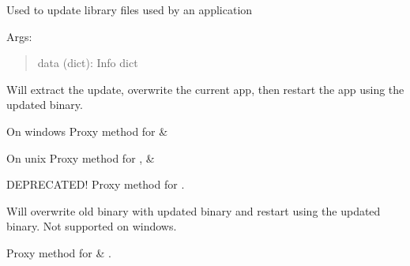 \documentclass[letterpaper,10pt,english]{sphinxmanual}
\begin{document}

\begin{fulllineitems}
\label{api:pyi_updater.client.updates.AppUpdate}
Used to update library files used by an application

Args:
\begin{quote}

data (dict): Info dict
\end{quote}

\begin{fulllineitems}
\label{api:pyi_updater.client.updates.AppUpdate.extract_restart}
Will extract the update, overwrite the current app,
then restart the app using the updated binary.

On windows Proxy method for  \&

On unix Proxy method for ,
 \& 

\end{fulllineitems}


\begin{fulllineitems}
\label{api:pyi_updater.client.updates.AppUpdate.install_restart}
DEPRECATED!  Proxy method for {\hyperref[api:pyi_updater.client.updates.AppUpdate.extract_restart]{}}.

\end{fulllineitems}


\begin{fulllineitems}
\label{api:pyi_updater.client.updates.AppUpdate.restart}
Will overwrite old binary with updated binary and
restart using the updated binary. Not supported on windows.

Proxy method for  \& .

\end{fulllineitems}


\end{fulllineitems}
\end{document}
